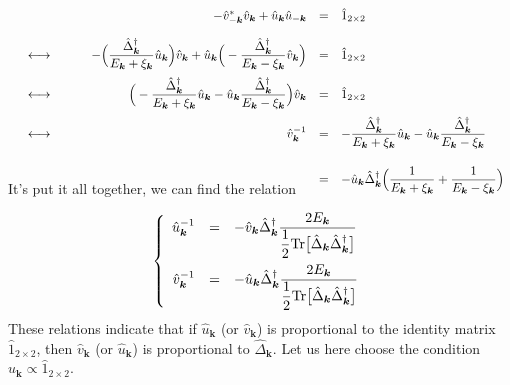 \documentclass[uplatex,a4j,12pt,dvipdfmx]{jsarticle}
\begin{document}
	\begin{eqnarray}
		\begin{array}{rcrcl}
			 &   &
			- \hat{v}_{-\bm{k}}^{*} \hat{v}_{\bm{k}} + \hat{u}_{\bm{k}} \hat{u}_{-\bm{k}}
			 & = &
			\hat{1}_{2 \times 2}
			\nonumber \\[4mm] &\longleftrightarrow& \hspace{8mm}
			- \Big( \dfrac{ \hat{\Delta}^{\dagger}_{\bm{k}} }{ E_{\bm{k}} + \xi_{\bm{k}} } \hat{u}_{\bm{k}} \Big)
			\hat{v}_{\bm{k}}
			+
			\hat{u}_{\bm{k}}
			\Big( - \dfrac{ \hat{\Delta}^{\dagger}_{\bm{k}} }{ E_{\bm{k}} - \xi_{\bm{k}} } \hat{v}_{\bm{k}} \Big)
			 & = &
			\hat{1}_{2 \times 2}
			\nonumber \\[4mm] &\longleftrightarrow& \hspace{8mm}
			\Big( - \dfrac{ \hat{\Delta}^{\dagger}_{\bm{k}} }{ E_{\bm{k}} + \xi_{\bm{k}} } \hat{u}_{\bm{k}}
			-
			\hat{u}_{\bm{k}}
			\dfrac{ \hat{\Delta}^{\dagger}_{\bm{k}} }{ E_{\bm{k}} - \xi_{\bm{k}} } \Big)
			\hat{v}_{\bm{k}}
			 & = &
			\hat{1}_{2 \times 2}
			\nonumber \\[4mm] &\longleftrightarrow& \hspace{8mm}
			{\hat{v}_{\bm{k}}}^{-1}
			 & = &
			- \dfrac{ \hat{\Delta}^{\dagger}_{\bm{k}} }{ E_{\bm{k}} + \xi_{\bm{k}} } \hat{u}_{\bm{k}}
			-
			\hat{u}_{\bm{k}}
			\dfrac{ \hat{\Delta}^{\dagger}_{\bm{k}} }{ E_{\bm{k}} - \xi_{\bm{k}} }
			\nonumber \\[7mm] &&
			 & = &
			- \hat{u}_{\bm{k}} \hat{\Delta}^{\dagger}_{\bm{k}}
			\Big(
			\dfrac{ 1 }{ E_{\bm{k}} + \xi_{\bm{k}} }
			+
			\dfrac{ 1 }{ E_{\bm{k}} - \xi_{\bm{k}} }
			\Big)
		\end{array}
		\\[-7mm]
	\end{eqnarray}
	It's put it all together, we can find the relation

	\begin{eqnarray}
		\left\{
		\begin{array}{rcl}
			{\hat{u}_{\bm{k}}}^{-1}
			 & = &
			- \hat{v}_{\bm{k}} \hat{\Delta}^{\dagger}_{\bm{k}}
			\dfrac{ 2 E_{\bm{k}} }{ \dfrac{1}{2} {\rm Tr} \big[ \hat{\Delta}_{\bm{k}} \hat{\Delta}^{\dagger}_{\bm{k}} \big] }
			\\[7mm]
			{\hat{v}_{\bm{k}}}^{-1}
			 & = &
			- \hat{u}_{\bm{k}} \hat{\Delta}^{\dagger}_{\bm{k}}
			\dfrac{ 2 E_{\bm{k}} }{ \dfrac{1}{2} {\rm Tr} \big[ \hat{\Delta}_{\bm{k}} \hat{\Delta}^{\dagger}_{\bm{k}} \big] }
		\end{array}
		\right.
	\end{eqnarray}
\fi
These relations indicate that if $\hat{u}_{\bm{k}}$ (or $\hat{v}_{\bm{k}}$) is proportional to the identity matrix $\hat{1}_{2 \times 2}$, then $\hat{v}_{\bm{k}}$ (or $\hat{u}_{\bm{k}}$) is proportional to $\hat{\Delta}_{\bm{k}}$.
Let us here choose the condition $\hat{u}_{\bm{k}} \propto \hat{1}_{2 \times 2}$.
\end{document}
